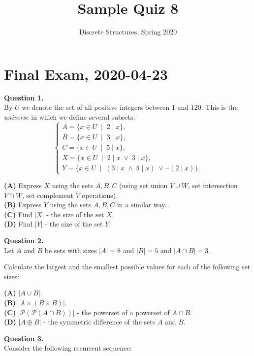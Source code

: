 \documentclass[jou]{apa6}
\title{Sample Quiz 8}
\author{Discrete Structures, Spring 2020}
\affiliation{RBS}
\begin{document}

\twocolumn
\section{Final Exam, 2020-04-23}

\vspace{4pt}
{\bf Question 1.}\\
By $U$ we denote the set of all positive integers 
between $1$ and $120$. This is the {\em universe} in which 
we define several subsets:
$$\left\{ \begin{array}{l}
A = \{ x \in U\;\mid\;2\mid{}x\},\\
B = \{ x \in U\;\mid\;3\mid{}x\},\\
C = \{ x \in U\;\mid\;5\mid{}x\},\\
X = \{ x \in U\;\mid\;2\mid{}x\;\vee\;3\mid{}x\},\\
Y = \{ x \in U\;\mid\;(3\mid{}x\;\wedge\;5\mid{}x)\;\vee\neg(2\mid{}x)\}.
\end{array} \right.$$

{\bf (A)} Express $X$ using the sets $A,B,C$ (using set union $V \cup W$, 
set intersection $V \cap W$, set complement $\overline{V}$ operations).\\
{\bf (B)} Express $Y$ using the sets $A,B,C$ in a similar way.\\
{\bf (C)} Find $|X|$ - the size of the set $X$.\\
{\bf (D)} Find $|Y|$ - the size of the set $Y$.




\vspace{10pt}
{\bf Question 2.}\\
Let $A$ and $B$ be sets with sizes $|A| = 8$ and $|B| = 5$
and $|A \cap B| = 3$. 

Calculate the largest and the smallest possible values 
for each of the following set sizes: 

{\bf (A)} $|A \cup B|$.\\
{\bf (B)} $|A \times (B \times B)|$.\\
{\bf (C)} $\left| \mathcal{P}(\mathcal{P}(A \cap B)) \right|$ - the 
powerset of a powerset of $A \cap B$.\\
{\bf (D)} $|A \oplus B|$ - the symmetric difference of the sets $A$ and $B$.


\vspace{10pt}
{\bf Question 3.}\\ 
Consider the following recurrent sequence: 
\end{document}
